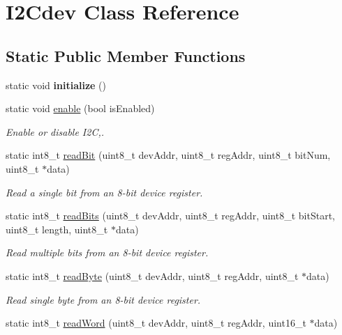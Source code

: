 \hypertarget{classI2Cdev}{}\section{I2\+Cdev Class Reference}
\label{classI2Cdev}
\subsection*{Static Public Member Functions}
\begin{DoxyCompactItemize}
\item 
\mbox{\label{classI2Cdev_a125a49c5f890f40119fc5fc158bc7c69}} 
static void {\bfseries initialize} ()
\item 
static void \mbox{\hyperlink{classI2Cdev_ab1fc6fb228f54f717cf317646a5751fc}{enable}} (bool is\+Enabled)
\begin{DoxyCompactList}\small\item\em Enable or disable I2C,. \end{DoxyCompactList}\item 
static int8\+\_\+t \mbox{\hyperlink{classI2Cdev_ac10d46777131c57b8446e70ed85561ec}{read\+Bit}} (uint8\+\_\+t dev\+Addr, uint8\+\_\+t reg\+Addr, uint8\+\_\+t bit\+Num, uint8\+\_\+t $\ast$data)
\begin{DoxyCompactList}\small\item\em Read a single bit from an 8-\/bit device register. \end{DoxyCompactList}\item 
static int8\+\_\+t \mbox{\hyperlink{classI2Cdev_aedf16ba82e784a6b8b82cd7c0fbd9159}{read\+Bits}} (uint8\+\_\+t dev\+Addr, uint8\+\_\+t reg\+Addr, uint8\+\_\+t bit\+Start, uint8\+\_\+t length, uint8\+\_\+t $\ast$data)
\begin{DoxyCompactList}\small\item\em Read multiple bits from an 8-\/bit device register. \end{DoxyCompactList}\item 
static int8\+\_\+t \mbox{\hyperlink{classI2Cdev_acff006382342043511e9dca5399dc7e1}{read\+Byte}} (uint8\+\_\+t dev\+Addr, uint8\+\_\+t reg\+Addr, uint8\+\_\+t $\ast$data)
\begin{DoxyCompactList}\small\item\em Read single byte from an 8-\/bit device register. \end{DoxyCompactList}\item 
static int8\+\_\+t \mbox{\hyperlink{classI2Cdev_a3c03c7a2d3c09fe2bac737df7d91ee6d}{read\+Word}} (uint8\+\_\+t dev\+Addr, uint8\+\_\+t reg\+Addr, uint16\+\_\+t $\ast$data)

\end{DoxyCompactItemize}
